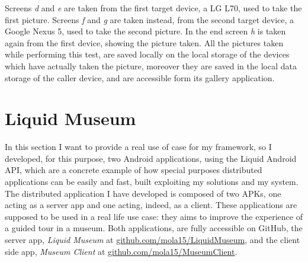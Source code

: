 Screens \textit{d} and \textit{e} are taken from the first target device, a LG L70, used to take the first picture. Screens \textit{f} and \textit{g} are taken instead, from the second target device, a Google Nexus 5, used to take the second picture. In the end screen \textit{h} is taken again from the first device, showing the picture taken. All the pictures taken while performing this test, are saved locally on the local storage of the devices which have actually taken the picture, moreover they are saved in the local data storage of the caller device, and are accessible form its gallery application.

\section{Liquid Museum}
In this section I want to provide a real use of case for my framework, so I developed, for this purpose, two Android applications, using the Liquid Android API, which are a concrete example of how special purposes distributed applications can be easily and fast, built exploiting my solutions and my system.\\
The distributed application I have developed is composed of two APKs, one acting as a server app and one acting, indeed, as a client. These applications are supposed to be used in a real life use case: they aims to improve the experience of a guided tour in a museum. Both applications, are fully accessible on GitHub, the server app, \textit{Liquid Museum} at \href{https://github.com/mola15/LiquidMuseum}{github.com/mola15/LiquidMuseum}, and the client side app, \textit{Museum Client} at \href{https://github.com/mola15/MuseumClient}{github.com/mola15/MuseumClient}.
